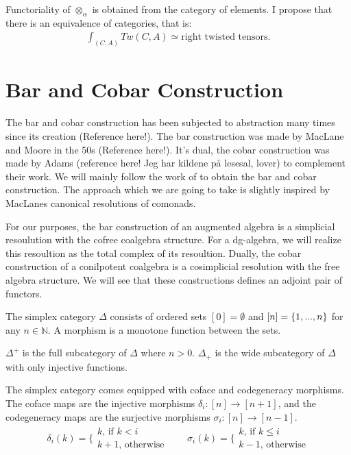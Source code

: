 \documentclass[../thesis.tex]{subfiles}
\begin{document}
            \begin{remark}
                Functoriality of $\otimes_\alpha$ is obtained from the category of elements. I propose that there is an equivalence of categories, that is:
                \begin{align*}
                    \int_{(C,A)} Tw(C,A) \simeq \text{right twisted tensors.}
                \end{align*}
            \end{remark}

    \section{Bar and Cobar Construction}

            The bar and cobar construction has been subjected to abstraction many times since its creation (Reference here!). The bar construction was made by MacLane and Moore in the 50s (Reference here!). It's dual, the cobar construction was made by Adams (reference here! Jeg har kildene på lesesal, lover) to complement their work. We will mainly follow the work of \cite{Loday12} to obtain the bar and cobar construction. The approach which we are going to take is slightly inspired by MacLanes\cite{MacLane71} canonical resolutions of comonads.

            For our purposes, the bar construction of an augmented algebra is a simplicial resoulution with the cofree coalgebra structure. For a dg-algebra, we will realize this resoultion as the total complex of its resoultion. Dually, the cobar construction of a conilpotent coalgebra is a cosimplicial resolution with the free algebra structure. We will see that these constructions defines an adjoint pair of functors.

            \begin{definition}
                The simplex category $\Delta$ consists of ordered sets $[0] = \emptyset$ and $[n] = \{1,...,n\}$ for any $n\in\mathbb{N}$. A morphism is a monotone function between the sets.

                $\Delta^+$ is the full subcategory of $\Delta$ where $n>0$. $\Delta_+$ is the wide subcategory of $\Delta$ with only injective functions.
            \end{definition} 

            The simplex category comes equipped with coface and codegeneracy morphisms. The coface maps are the injective morphisms $\delta_i : [n] \rightarrow [n+1]$, and the codegeneracy maps are the surjective morphisms $\sigma_i: [n] \rightarrow [n-1]$.
            \begin{align*}
                \delta_i(k) = \biggl\{\substack{k\text{, if }k<i \\ k+1\text{, otherwise}} \qquad
                \sigma_i(k) = \biggl\{\substack{k\text{, if }k\leq i \\ k-1\text{, otherwise}}
            \end{align*}
\end{document}
